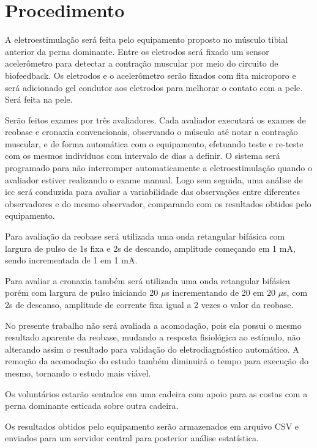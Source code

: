 \section{Procedimento}
A eletroestimulação será feita pelo equipamento proposto no músculo tibial anterior da perna dominante. Entre os eletrodos será fixado um sensor acelerômetro para detectar a contração muscular por meio do circuito de biofeedback. Os eletrodos e o acelerômetro serão fixados com fita microporo e será adicionado gel condutor aos eletrodos para melhorar o contato com a pele. Será feita  na pele.

Serão feitos exames por três avaliadores. Cada avaliador executará os exames de reobase e cronaxia convencionais, observando o músculo até notar a contração muscular, e de forma automática com o equipamento, efetuando teste e re-teste com os mesmos indivíduos com intervalo de dias a definir. O sistema será programado para não interromper automaticamente a eletroestimulação quando o avaliador estiver realizando o exame manual. Logo sem seguida, uma análise de \ac{icc} será conduzida para avaliar a variabilidade das observações entre diferentes observadores e do mesmo observador, comparando com os resultados obtidos pelo equipamento.

Para avaliação da reobase será utilizada uma onda retangular bifásica com largura de pulso de 1s fixa e 2s de descando, amplitude começando em 1 mA, sendo incrementada de 1 em 1 mA.

Para avaliar a cronaxia também será utilizada uma onda retangular bifásica porém com largura de pulso iniciando 20 $\mu$s incrementando de 20 em 20 $\mu$s, com 2s de descanso, amplitude de corrente fixa igual a 2 vezes o valor da reobase.

No presente trabalho não será avaliada a acomodação, pois ela possui o mesmo resultado aparente da reobase, mudando a resposta fisiológica ao estímulo, não alterando assim o resultado para validação do eletrodiagnóstico automático. A remoção da acomodação do estudo também diminuirá o tempo para execução do mesmo, tornando o estudo mais viável.

Os voluntários estarão sentados em uma cadeira com apoio para as costas com a perna dominante esticada sobre outra cadeira.

Os resultados obtidos pelo equipamento serão armazenados em arquivo CSV e enviados para um servidor central para posterior análise estatística.